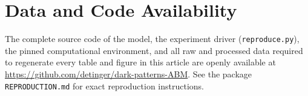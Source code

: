\documentclass[a4paper,fleqn]{cas-sc}
\begin{document}


\section*{Data and Code Availability}
\label{sec:availability}
The complete source code of the model, the experiment driver (\texttt{reproduce.py}), the pinned computational environment, and all raw and processed data required to regenerate every table and figure in this article are openly available at \url{https://github.com/detinger/dark-patterns-ABM}. See the package \texttt{REPRODUCTION.md} for exact reproduction instructions.



\end{document}
